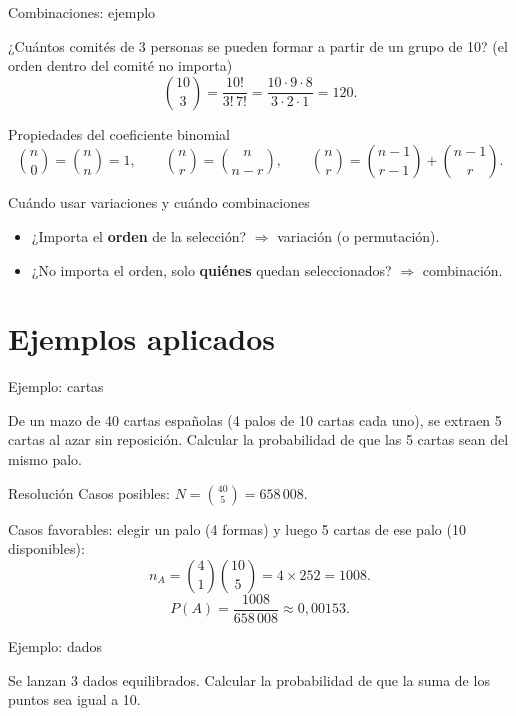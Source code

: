 \documentclass[aspectratio=169,11pt]{beamer}
\begin{document}
\begin{frame}{Combinaciones: ejemplo}
\begin{example}
¿Cuántos comités de 3 personas se pueden formar a partir de un grupo de 10? (el orden dentro del comité no importa)
\[
\binom{10}{3} = \frac{10!}{3!\,7!} = \frac{10\cdot 9\cdot 8}{3\cdot 2\cdot 1} = 120.
\]
\end{example}
\end{frame}

\begin{frame}{Propiedades del coeficiente binomial}
\[
\binom{n}{0}=\binom{n}{n}=1, \qquad \binom{n}{r}=\binom{n}{n-r}, \qquad \binom{n}{r}=\binom{n-1}{r-1}+\binom{n-1}{r}.
\]
\begin{block}{Cuándo usar variaciones y cuándo combinaciones}
\begin{itemize}
\item ¿Importa el \textbf{orden} de la selección? $\Rightarrow$ variación (o permutación).
\item ¿No importa el orden, solo \textbf{quiénes} quedan seleccionados? $\Rightarrow$ combinación.
\end{itemize}
\end{block}
\end{frame}

\section{Ejemplos aplicados}

\begin{frame}{Ejemplo: cartas}
\begin{example}
De un mazo de 40 cartas españolas (4 palos de 10 cartas cada uno), se extraen 5 cartas al azar sin reposición. Calcular la probabilidad de que las 5 cartas sean del mismo palo.
\end{example}
\begin{block}{Resolución}
Casos posibles: $N = \binom{40}{5} = 658\,008$.

Casos favorables: elegir un palo (4 formas) y luego 5 cartas de ese palo (10 disponibles):
\[
n_A = \binom{4}{1}\binom{10}{5} = 4 \times 252 = 1008.
\]
\[
P(A) = \frac{1008}{658\,008} \approx 0{,}00153.
\]
\end{block}
\end{frame}

\begin{frame}{Ejemplo: dados}
\begin{example}
Se lanzan 3 dados equilibrados. Calcular la probabilidad de que la suma de los puntos sea igual a 10.
\end{example}
\end{frame}
\end{document}
